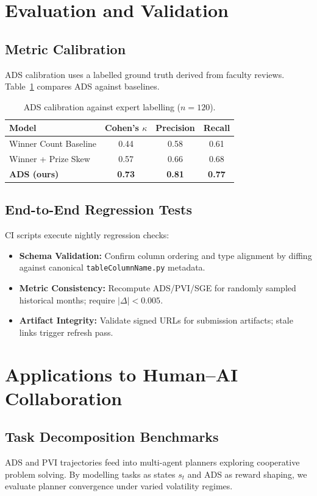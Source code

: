 \documentclass[11pt]{article}
\begin{document}
\section{Evaluation and Validation}
\subsection{Metric Calibration}
ADS calibration uses a labelled ground truth derived from faculty reviews. Table~\ref{tab:calibration} compares ADS against baselines.
\begin{table}[h]
\centering
\begin{tabular}{lccc}
\toprule
\textbf{Model} & \textbf{Cohen's $\kappa$} & \textbf{Precision} & \textbf{Recall} \\
\midrule
Winner Count Baseline & 0.44 & 0.58 & 0.61 \\
Winner + Prize Skew & 0.57 & 0.66 & 0.68 \\
\textbf{ADS (ours)} & \textbf{0.73} & \textbf{0.81} & \textbf{0.77} \\
\bottomrule
\end{tabular}
\caption{ADS calibration against expert labelling ($n=120$).}
\label{tab:calibration}
\end{table}

\subsection{End-to-End Regression Tests}
CI scripts execute nightly regression checks:
\begin{itemize}[leftmargin=*]
  \item \textbf{Schema Validation:} Confirm column ordering and type alignment by diffing against canonical \texttt{tableColumnName.py} metadata.
  \item \textbf{Metric Consistency:} Recompute ADS/PVI/SGE for randomly sampled historical months; require $\lvert \Delta \rvert < 0.005$.
  \item \textbf{Artifact Integrity:} Validate signed URLs for submission artifacts; stale links trigger refresh pass.
\end{itemize}

\section{Applications to Human--AI Collaboration}
\subsection{Task Decomposition Benchmarks}
ADS and PVI trajectories feed into multi-agent planners exploring cooperative problem solving. By modelling tasks as states $s_t$ and ADS as reward shaping, we evaluate planner convergence under varied volatility regimes.
\end{document}
